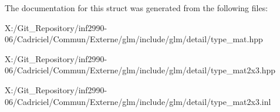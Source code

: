 The documentation for this struct was generated from the following files\-:\begin{DoxyCompactItemize}
\item 
X\-:/\-Git\-\_\-\-Repository/inf2990-\/06/\-Cadriciel/\-Commun/\-Externe/glm/include/glm/detail/type\-\_\-mat.\-hpp\item 
X\-:/\-Git\-\_\-\-Repository/inf2990-\/06/\-Cadriciel/\-Commun/\-Externe/glm/include/glm/detail/type\-\_\-mat2x3.\-hpp\item 
X\-:/\-Git\-\_\-\-Repository/inf2990-\/06/\-Cadriciel/\-Commun/\-Externe/glm/include/glm/detail/type\-\_\-mat2x3.\-inl\end{DoxyCompactItemize}
